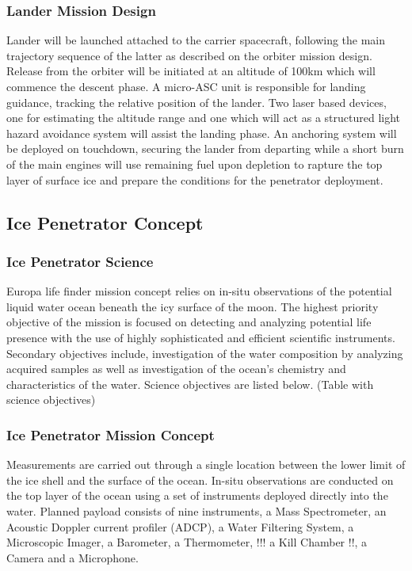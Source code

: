 \subsubsection{Lander Mission Design}

Lander will be launched attached to the carrier spacecraft, following the main trajectory sequence of the latter as described on the orbiter mission design.  
Release from the orbiter will be initiated at an altitude of 100km which will commence the descent phase. A micro-ASC unit is responsible for landing guidance, tracking the relative position of the lander. Two laser based devices, one for estimating the altitude range and one which will act as a structured light hazard avoidance system will assist the landing phase. An anchoring system will be deployed on touchdown, securing the lander from departing while a short burn of the main engines will use remaining fuel upon depletion to rapture the top layer of surface ice and prepare the conditions for the penetrator deployment. 

\subsection{Ice Penetrator Concept}

\subsubsection{Ice Penetrator Science}

Europa life finder mission concept relies on in-situ observations of the potential liquid water ocean beneath the icy surface of the moon. The highest priority objective of the mission is focused on detecting and analyzing potential life presence with the use of highly sophisticated and efficient scientific instruments. Secondary objectives include, investigation of the water composition by analyzing acquired samples as well as investigation of the ocean’s chemistry and characteristics of the water.
Science objectives are listed below.
(Table with science objectives)

\subsubsection{Ice Penetrator Mission Concept}

Measurements are carried out through a single location between the lower limit of the ice shell and the surface of the ocean. In-situ observations are conducted on the top layer of the ocean using a set of instruments deployed directly into the water.
Planned payload consists of nine instruments, a Mass Spectrometer, an Acoustic Doppler current profiler (ADCP), a Water Filtering System, a Microscopic Imager, a Barometer, a Thermometer, !!! a Kill Chamber !!, a Camera and a Microphone.

